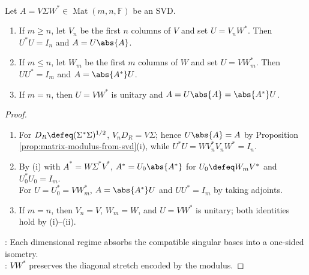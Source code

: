 \begin{theorem} \label{thm:rectangular-polar-decomposition} \\
Let $A=V\Sigma W^*\in\operatorname{Mat}(m,n,\mathbb{F})$ be an SVD.
\begin{enumerate}[label=(\roman*)]
\setlength{\itemsep}{0pt}
\item If $m\geq n$, let $V_n$ be the first $n$ columns of $V$ and set $U=V_nW^*$. Then $U^*U=I_n$ and $A=U\abs{A}$.
\item If $m\leq n$, let $W_m$ be the first $m$ columns of $W$ and set $U=VW_m^*$. Then $UU^*=I_m$ and $A=\abs{A^*}U$.
\item If $m=n$, then $U=VW^*$ is unitary and $A=U\abs{A}=\abs{A^*}U$.
\end{enumerate}
\begin{proof}
\begin{enumerate}[label=(\roman*)]
\setlength{\itemsep}{0pt}
\item For $D_R\defeq(\Sigma^*\Sigma)^{1/2}$, $V_nD_R=V\Sigma$; hence $U\abs{A}=A$ by Proposition \ref{prop:matrix-modulus-from-svd}(i), while $U^*U=WV_n^*V_nW^*=I_n$.
\item By (i) with $A^*=W\Sigma^*V^*$, $A^*=U_0\abs{A^*}$ for $U_0\defeq W_mV^*$ and $U_0^*U_0=I_m$.\\
For $U=U_0^*=VW_m^*$, $A=\abs{A^*}U$ and $UU^*=I_m$ by taking adjoints.
\item If $m=n$, then $V_n=V$, $W_m=W$, and $U=VW^*$ is unitary; both identities hold by (i)--(ii).
\end{enumerate}
: Each dimensional regime absorbs the compatible singular bases into a one-sided isometry.\\
: $VW^*$ preserves the diagonal stretch encoded by the modulus.
\end{proof}
\end{theorem}

